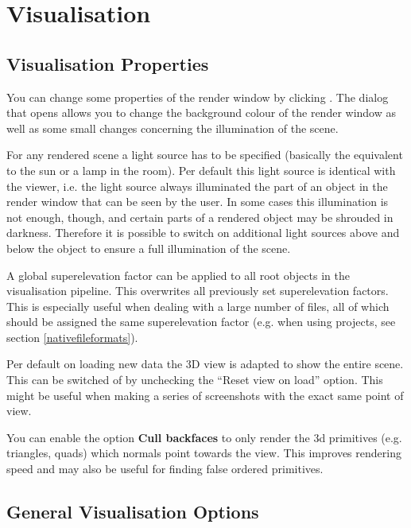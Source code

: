 \chapter{Visualisation}

\section{Visualisation Properties}

You can change some properties of the render window by clicking  . The dialog that opens allows you to change the background colour of the render window as well as some small changes concerning the illumination of the scene.

For any rendered scene a light source has to be specified (basically the equivalent to the sun or a lamp in the room). Per default this light source is identical with the viewer, i.e. the light source always illuminated the part of an object in the render window that can be seen by the user. In some cases this illumination is not enough, though, and certain parts of a rendered object may be shrouded in darkness. Therefore it is possible to switch on additional light sources above and below the object to ensure a full illumination of the scene.

A global superelevation factor can be applied to all root objects in the visualisation pipeline. This overwrites all previously set superelevation factors. This is especially useful when dealing with a large number of files, all of which should be assigned the same superelevation factor (e.g. when using \ogs projects, see section \ref{nativefileformats}).

Per default on loading new data the 3D view is adapted to show the entire scene. This can be switched of by unchecking the ``Reset view on load'' option. This might be useful when making a series of screenshots with the exact same point of view.

You can enable the option \textbf{Cull backfaces} to only render the 3d primitives (e.g. triangles, quads) which normals point towards the view. This improves rendering speed and may also be useful for finding false ordered primitives.

\section{General Visualisation Options}
\label{genvisoptions}

